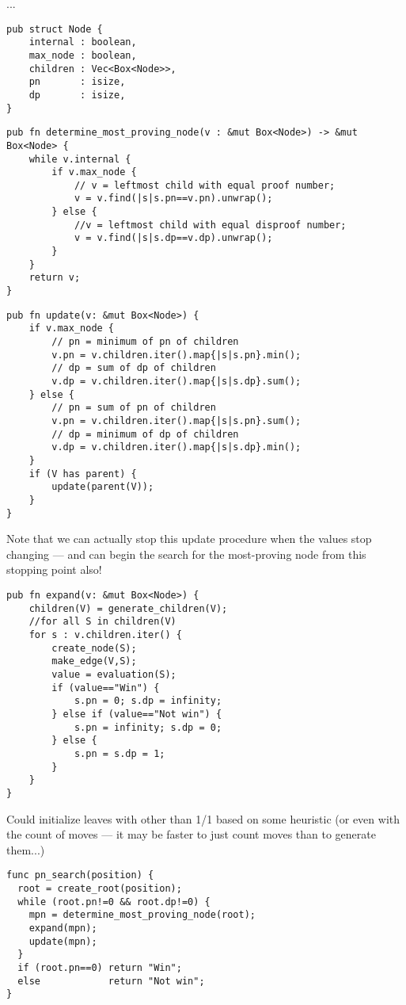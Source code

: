 \documentclass[10pt,dvipdfmx]{report}
\begin{document}
...
{\scriptsize\begin{verbatim}
pub struct Node {
    internal : boolean,
    max_node : boolean,
    children : Vec<Box<Node>>,
    pn       : isize,
    dp       : isize,
}
\end{verbatim}}

{\scriptsize\begin{verbatim}
pub fn determine_most_proving_node(v : &mut Box<Node>) -> &mut Box<Node> {
    while v.internal {
        if v.max_node {
            // v = leftmost child with equal proof number;
            v = v.find(|s|s.pn==v.pn).unwrap();
        } else {
            //v = leftmost child with equal disproof number;
            v = v.find(|s|s.dp==v.dp).unwrap();
        }
    }
    return v;
}
\end{verbatim}}

{\scriptsize\begin{verbatim}
pub fn update(v: &mut Box<Node>) {
    if v.max_node {
        // pn = minimum of pn of children
        v.pn = v.children.iter().map{|s|s.pn}.min();
        // dp = sum of dp of children
        v.dp = v.children.iter().map{|s|s.dp}.sum();
    } else {
        // pn = sum of pn of children
        v.pn = v.children.iter().map{|s|s.pn}.sum();
        // dp = minimum of dp of children
        v.dp = v.children.iter().map{|s|s.dp}.min();
    }
    if (V has parent) {
        update(parent(V));
    }
}
\end{verbatim}}
Note that we can actually stop this update procedure when
the values stop changing --- and can begin the search
for the most-proving node from this stopping point also!

{\scriptsize\begin{verbatim}
pub fn expand(v: &mut Box<Node>) {
    children(V) = generate_children(V);
    //for all S in children(V)
    for s : v.children.iter() {
        create_node(S);
        make_edge(V,S);
        value = evaluation(S);
        if (value=="Win") {
            s.pn = 0; s.dp = infinity;
        } else if (value=="Not win") {
            s.pn = infinity; s.dp = 0;
        } else {
            s.pn = s.dp = 1;
        }
    }
}
\end{verbatim}}
Could initialize leaves with other than 1/1 based on some heuristic
(or even with the count of moves --- it may be faster to just count
moves than to generate them...)

{\scriptsize\begin{verbatim}
func pn_search(position) {
  root = create_root(position);
  while (root.pn!=0 && root.dp!=0) {
    mpn = determine_most_proving_node(root);
    expand(mpn);
    update(mpn);
  }
  if (root.pn==0) return "Win";
  else            return "Not win";
}
\end{verbatim}}
\end{document}
